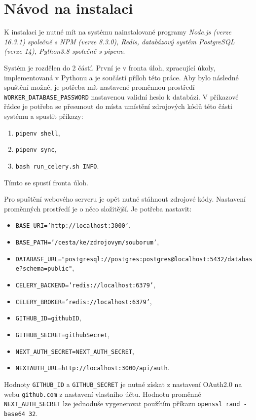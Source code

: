 \documentclass[czech,semestral]{diploma}
\begin{document}
\MakeTitlePages








\printbibliography[title={Literatura}, heading=bibintoc]

\appendix
\chapter{Návod na instalaci}\label{chap:appendix-1}
K instalaci je nutné mít na systému nainstalované programy
\emph{Node.js (verze 16.3.1) společně s NPM (verze 8.3.0), Redis, databázový systém PostgreSQL (verze 14), Python3.8 společně s pipenv}.

Systém je rozdělen do 2 částí. První je v fronta úloh, zpracující úkoly, implementovaná v Pythonu a je součástí příloh této práce.
Aby bylo následné spuštění možné, je potřeba mít nastavené proměnnou prostředí \texttt{WORKER\_DATABASE\_PASSWORD} nastavenou validní heslo k databázi.
V příkazové řádce je potřeba se přesunout do místa umístění zdrojových kódů této části systému a spustit příkazy:
\begin{enumerate}
    \item \texttt{pipenv shell},
    \item \texttt{pipenv sync},
    \item \texttt{bash run\_celery.sh INFO}.
\end{enumerate}
Tímto se spustí fronta úloh.

Pro spuštění webového serveru je opět nutné stáhnout zdrojové kódy. Nastavení proměnných prostředí je o něco složitější.
Je potřeba nastavit:

\begin{itemize}
    \item \texttt{BASE\_URI='http://localhost:3000'},
    \item \texttt{BASE\_PATH='/cesta/ke/zdrojovym/souborum'},
    \item \texttt{DATABASE\_URL="postgresql://postgres:postgres@localhost:5432/database?schema=public"},
    \item \texttt{CELERY\_BACKEND='redis://localhost:6379'},
    \item \texttt{CELERY\_BROKER='redis://localhost:6379'},
    \item \texttt{GITHUB\_ID=githubID},
    \item \texttt{GITHUB\_SECRET=githubSecret},
    \item \texttt{NEXT\_AUTH\_SECRET=NEXT\_AUTH\_SECRET},
    \item \texttt{NEXTAUTH\_URL=http://localhost:3000/api/auth}.
\end{itemize}
Hodnoty \texttt{GITHUB\_ID} a \texttt{GITHUB\_SECRET} je nutné získat z nastavení OAuth2.0 na webu \texttt{github.com} z nastavení vlastního účtu.
Hodnotu proměnné \texttt{NEXT\_AUTH\_SECRET} lze jednoduše vygenerovat použítím příkazu \texttt{openssl rand -base64 32}.
\end{document}
